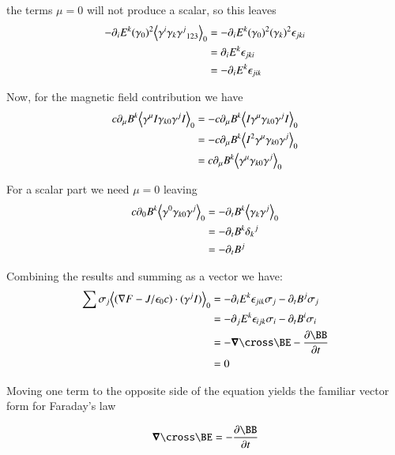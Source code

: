the terms $\mu = 0$ will not produce a scalar, so this leaves
\begin{align*}
-\partial_{i} E^k (\gamma_0)^2 {\left\langle{{ \gamma^{i} \gamma_{k} {\gamma^j}_{123} }}\right\rangle}_{0}
&= -\partial_{i} E^k (\gamma_0)^2 (\gamma_k)^2 \epsilon_{jki} \\
&= \partial_{i} E^k \epsilon_{j k i} \\
&= -\partial_{i} E^k \epsilon_{jik} \\
\end{align*}

Now, for the magnetic field contribution we have
\begin{align*}
c \partial_{\mu} B^k {\left\langle{{ \gamma^{\mu} I \gamma_{k0} {\gamma^j} I }}\right\rangle}_{0} 
&= - c \partial_{\mu} B^k {\left\langle{{ I \gamma^{\mu} \gamma_{k0} {\gamma^j} I }}\right\rangle}_{0} \\
&= - c \partial_{\mu} B^k {\left\langle{{ I^2 \gamma^{\mu} \gamma_{k0} {\gamma^j} }}\right\rangle}_{0} \\
&= c \partial_{\mu} B^k {\left\langle{{ \gamma^{\mu} \gamma_{k0} {\gamma^j} }}\right\rangle}_{0} \\
\end{align*}

For a scalar part we need $\mu = 0$ leaving
\begin{align*}
c \partial_{0} B^k {\left\langle{{ \gamma^{0} \gamma_{k0} {\gamma^j} }}\right\rangle}_{0} 
&= -\partial_{t} B^k {\left\langle{{ \gamma_{k} {\gamma^j} }}\right\rangle}_{0} \\
&= -\partial_{t} B^k {\delta_{k}}^j \\
&= -\partial_{t} B^j
\end{align*}

Combining the results and summing as a vector we have:
\begin{align*}
\sum \sigma_j \gpgradezero{( \grad F - J/\epsilon_0 c ) \cdot (\gamma^j I)}
&= -\partial_{i} E^k \epsilon_{jik} \sigma_j -\partial_{t} B^j \sigma_j \\
&= -\partial_{j} E^k \epsilon_{i j k} \sigma_i -\partial_{t} B^i \sigma_i \\
&= -\spacegrad \cross \BE - \PD{t}{\BB} \\
&= 0
\end{align*}

Moving one term to the opposite side of the equation yields the familiar vector form for Faraday's law

\begin{equation}
\spacegrad \cross \BE = -\PD{t}{\BB}
\end{equation}

